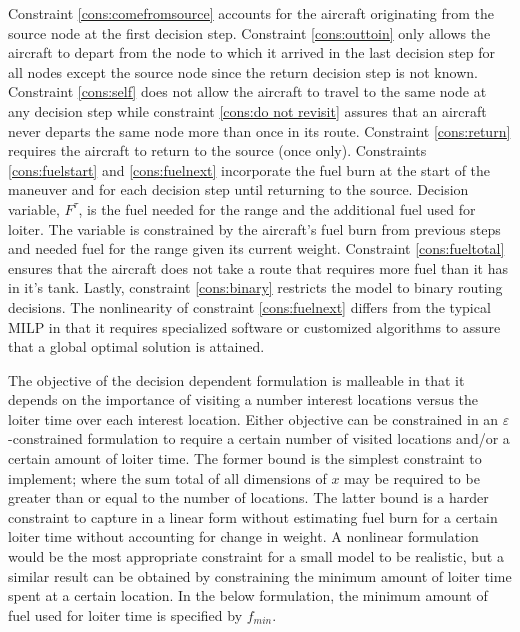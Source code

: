 Constraint \eqref{cons:comefromsource} accounts for the aircraft originating from the source node at the first decision step. Constraint \eqref{cons:outtoin} only allows the aircraft to depart from the node to which it arrived in the last decision step for all nodes except the source node since the return decision step is not known. Constraint \eqref{cons:self} does not allow the aircraft to travel to the same node at any decision step while constraint \eqref{cons:do not revisit} assures that an aircraft never departs the same node more than once in its route.  Constraint \eqref{cons:return} requires the aircraft to return to the source (once only). Constraints \eqref{cons:fuelstart} and \eqref{cons:fuelnext} incorporate the fuel burn at the start of the maneuver and for each decision step until returning to the source. Decision variable, $F^{\tau}$, is the fuel needed for the range and the additional fuel used for loiter. The variable is constrained by the aircraft's fuel burn from previous steps and needed fuel for the range given its current weight. Constraint \eqref{cons:fueltotal} ensures that the aircraft does not take a route that requires more fuel than it has in it's tank. Lastly, constraint \eqref{cons:binary} restricts the model to binary routing decisions. The nonlinearity of constraint \eqref{cons:fuelnext} differs from the typical MILP in that it requires specialized software or customized algorithms to assure that a global optimal solution is attained.\par
The objective of the decision dependent formulation is malleable in that it depends on the importance of visiting a number interest locations versus the loiter time over each interest location. Either objective can be constrained in an $\varepsilon$-constrained formulation to require a certain number of visited locations and/or a certain amount of loiter time. The former bound is the simplest constraint to implement; where the sum total of all dimensions of $x$ may be required to be greater than or equal to the number of locations. The latter bound is a harder constraint to capture in a linear form without estimating fuel burn for a certain loiter time without accounting for change in weight. A nonlinear formulation would be the most appropriate constraint for a small model to be realistic, but a similar result can be obtained by constraining the minimum amount of loiter time spent at a certain location. In the below formulation, the minimum amount of fuel used for loiter time is specified by $f_{min}$.

